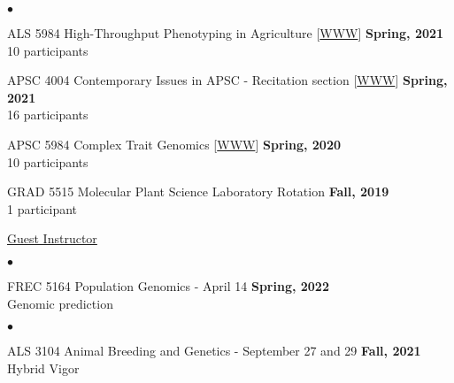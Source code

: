 \documentclass[margin,line,10pt]{res}
\newenvironment{list2}{
  \begin{list}{$\bullet$}{%
      \setlength{\itemsep}{0in}
      \setlength{\parsep}{0in} \setlength{\parskip}{0in}
      \setlength{\topsep}{0in} \setlength{\partopsep}{0in} 
      \setlength{\leftmargin}{0.2in}}}{\end{list}}
\begin{document}
\begin{resume}
\begin{list2}
  \item ALS 5984 High-Throughput Phenotyping in Agriculture [\textcolor{blue}{\href{http://morotalab.org/als5984-2021/ALS5984.html}{WWW}}] 
  \hfill {\bf Spring, 2021} \\
         10  participants 
  
         \vspace{0.5cm}

         
  \item APSC 4004 Contemporary Issues in APSC - Recitation section [\textcolor{blue}{\href{http://morotalab.org/apsc4004-2021/syllabus4004-10730.pdf}{WWW}}] 
  \hfill {\bf Spring, 2021} \\
         16  participants 
  
         \vspace{0.5cm}
         
\item APSC 5984 Complex Trait Genomics [\textcolor{blue}{\href{http://morotalab.org/apsc5984-2020/APSC5984.html}{WWW}}] 
  \hfill {\bf Spring, 2020} \\
         10  participants %
  
     \vspace{0.5cm}

     
\item GRAD 5515 Molecular Plant Science Laboratory Rotation
  \hfill {\bf Fall, 2019} \\
  1 participant

\end{list2}

     \vspace{0.3cm}


\underline{Guest Instructor}



\vspace{0.4cm}
 \begin{list2}
 \item FREC 5164 Population Genomics - April 14  \hfill {\bf Spring, 2022} \\
   Genomic prediction
\end{list2}


\vspace{0.4cm}
 \begin{list2}
 \item ALS 3104 Animal Breeding and Genetics  - September 27 and 29  \hfill {\bf Fall, 2021} \\
   Hybrid Vigor 
\end{list2}


\end{resume}
\end{document}
